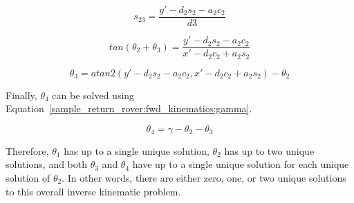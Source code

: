 \begin{equation}\label{sample_return_rover:inv_kinematics:s23}
	s_{23} = \frac{y' - d_{2}s_{2} - a_{2}c_{2}}{d3}
\end{equation}

\begin{equation}\label{sample_return_rover:inv_kinematics:t23}
	tan(\theta_{2} + \theta_{3}) = \frac{y' - d_{2}s_{2} - a_{2}c_{2}}{x'- d_{2}c_{2} + a_{2}s_{2}}
\end{equation}

\begin{equation}\label{sample_return_rover:inv_kinematics:th3}
	\theta_{3} = atan2(y' - d_{2}s_{2} - a_{2}c_{2}, x'- d_{2}c_{2} + a_{2}s_{2}) - \theta_{2}
\end{equation}

Finally, $\theta_{4}$ can be solved using Equation~\ref{sample_return_rover:fwd_kinematics:gamma}.

\begin{equation}
	\theta_{4} = \gamma - \theta_{2} - \theta_{3}
\end{equation}

Therefore, $\theta_{1}$ has up to a single unique solution, $\theta_{2}$ has up to two unique solutions, and both $\theta_{3}$ and $\theta_{4}$ have up to a single unique solution for each unique solution of $\theta_{2}$. In other words, there are either zero, one, or two unique solutions to this overall inverse kinematic problem.

